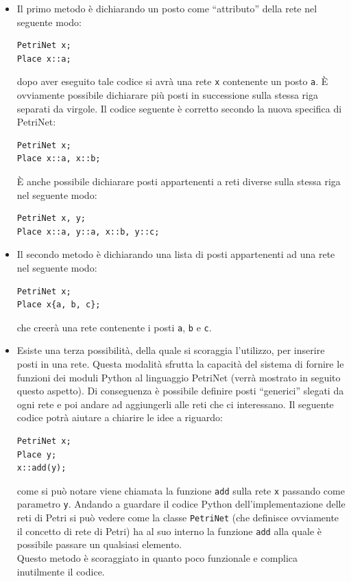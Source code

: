 \documentclass[italian,12pt]{book}
\begin{document}
\begin{itemize}

\item Il primo metodo è dichiarando un posto come ``attributo'' della rete nel seguente modo:
\begin{verbatim}PetriNet x;
Place x::a;
\end{verbatim}
dopo aver eseguito tale codice si avrà una rete {\tt x} contenente un posto {\tt a}.
È ovviamente possibile dichiarare più posti in successione sulla stessa riga separati da 
virgole. Il codice seguente è corretto secondo la nuova specifica di PetriNet:
\begin{verbatim}PetriNet x;
Place x::a, x::b;
\end{verbatim}
È anche possibile dichiarare posti appartenenti a reti diverse sulla stessa riga nel seguente modo:
\begin{verbatim}PetriNet x, y;
Place x::a, y::a, x::b, y::c;
\end{verbatim}

\item Il secondo metodo è dichiarando una lista di posti appartenenti ad una rete nel seguente modo:
\begin{verbatim}PetriNet x;
Place x{a, b, c};
\end{verbatim}
che creerà una rete contenente i posti {\tt a}, {\tt b} e {\tt c}.

\item Esiste una terza possibilità, della quale si scoraggia l'utilizzo, per inserire posti in una rete.
Questa modalità sfrutta la capacità del sistema di fornire le funzioni dei moduli Python al linguaggio PetriNet
(verrà mostrato in seguito questo aspetto). Di conseguenza è possibile definire posti ``generici'' slegati da 
ogni rete e poi andare ad aggiungerli alle reti che ci interessano. Il seguente codice potrà aiutare a chiarire
le idee a riguardo:
\begin{verbatim}PetriNet x;
Place y;
x::add(y);
\end{verbatim}
come si può notare viene chiamata la funzione {\tt add} sulla rete {\tt x} passando come parametro {\tt y}.
Andando a guardare il codice Python dell'implementazione delle reti di Petri si può vedere come la classe 
{\tt PetriNet} (che definisce ovviamente il concetto di rete di Petri) ha al suo interno la funzione {\tt add}
alla quale è possibile passare un qualsiasi elemento.\\
Questo metodo è scoraggiato in quanto poco funzionale e complica inutilmente il codice.
\end{itemize}
\end{document}
